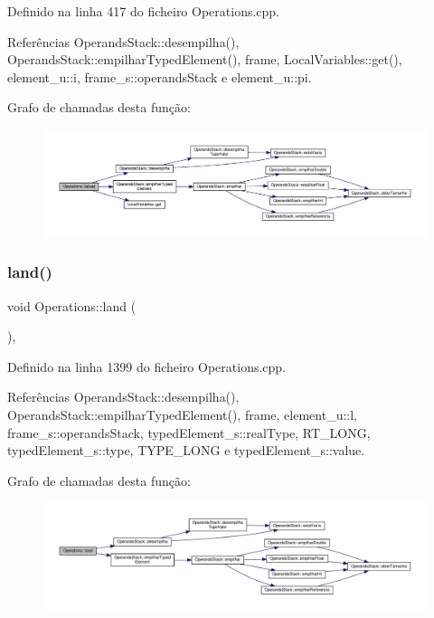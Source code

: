 Definido na linha 417 do ficheiro Operations.\+cpp.



Referências Operands\+Stack\+::desempilha(), Operands\+Stack\+::empilhar\+Typed\+Element(), frame, Local\+Variables\+::get(), element\+\_\+u\+::i, frame\+\_\+s\+::operands\+Stack e element\+\_\+u\+::pi.

Grafo de chamadas desta função\+:
\nopagebreak
\begin{figure}[H]
\begin{center}
\leavevmode
\includegraphics[width=350pt]{classOperations_a064f10825e8f0153ef19d466845d3734_cgraph}
\end{center}
\end{figure}
\mbox{\label{classOperations_a6104d728be025abb71570139b988ed4e}} 
\subsubsection{\texorpdfstring{land()}{land()}}
{\footnotesize\ttfamily void Operations\+::land (\begin{DoxyParamCaption}{ }\end{DoxyParamCaption})\hspace{0.3cm}{\ttfamily [static]}, {\ttfamily [private]}}



Definido na linha 1399 do ficheiro Operations.\+cpp.



Referências Operands\+Stack\+::desempilha(), Operands\+Stack\+::empilhar\+Typed\+Element(), frame, element\+\_\+u\+::l, frame\+\_\+s\+::operands\+Stack, typed\+Element\+\_\+s\+::real\+Type, R\+T\+\_\+\+L\+O\+NG, typed\+Element\+\_\+s\+::type, T\+Y\+P\+E\+\_\+\+L\+O\+NG e typed\+Element\+\_\+s\+::value.

Grafo de chamadas desta função\+:
\nopagebreak
\begin{figure}[H]
\begin{center}
\leavevmode
\includegraphics[width=350pt]{classOperations_a6104d728be025abb71570139b988ed4e_cgraph}
\end{center}
\end{figure}
\mbox{\label{classOperations_a562813150c331183212c11e5593b83c6}} 
